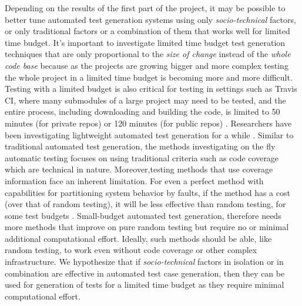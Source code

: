 \documentclass[10pt]{article}
\begin{document}
 Depending on the results of the first part of the project, it may be possible to better tune automated test generation systems using only \emph{socio-technical} factors, or only traditional factors or a combination of them that works well for limited time budget. It's important to investigate limited time budget test generation techniques that are only proportional to the \emph{size of change} instead of the \emph{whole code base} because as the projects are growing bigger and more complex testing the whole project in a limited time budget is becoming more and more difficult. Testing with a limited budget is also critical for testing in settings such as Travis CI, where many submodules of a large project may need to be tested, and the entire process, including downloading and building the code, is limited to 50 minutes (for private repos) or 120 minutes (for public repos) \cite{TravisDoc}. Researchers have been investigating lightweight automated test generation for a while \cite{groce2012lightweight}. Similar to traditional automated test generation, the methods investigating on the fly automatic testing focuses on using traditional criteria such as code coverage which are technical in nature. Moreover,testing methods that use coverage information face an inherent limitation. For even a perfect method with capabilities for partitioning system behavior by faults, if the method has a cost (over that of random testing), it will be less effective than random testing, for some test budgets \cite{AutoEfficiency}. Small-budget automated test generation, therefore needs more methods that improve on pure random testing but require no or minimal additional computational effort. Ideally, such methods should be able, like random testing, to work even without code coverage or other complex infrastructure. We hypothesize that if \emph{socio-technical} factors in isolation or in combination are effective in automated test case generation, then they can be used for generation of tests for a limited time budget as they require minimal computational effort.

 

\end{document}
